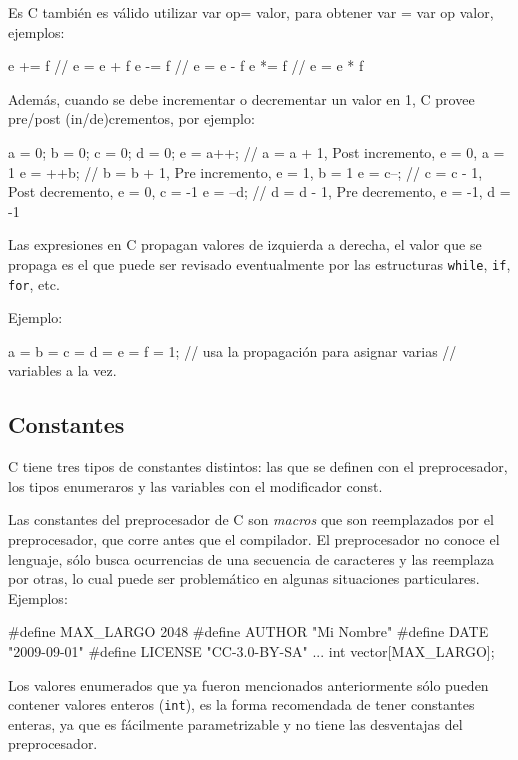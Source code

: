 Es C también es válido utilizar var op= valor, para obtener var = var op
valor, ejemplos:

\begin{codigo-c-plano}
e += f // e = e + f
e -= f // e = e - f
e *= f // e = e * f
\end{codigo-c-plano}

Además, cuando se debe incrementar o decrementar un valor en 1, C provee
pre/post (in/de)crementos, por ejemplo:

\begin{codigo-c-plano}
a = 0; b = 0; c = 0; d = 0;
e = a++; // a = a + 1, Post incremento, e = 0, a = 1
e = ++b; // b = b + 1, Pre incremento, e = 1, b = 1
e = c--; // c = c - 1, Post decremento, e = 0, c = -1
e = --d; // d = d - 1, Pre  decremento, e = -1, d = -1
\end{codigo-c-plano}

Las expresiones en C propagan valores de izquierda a derecha, el valor que se
propaga es el que puede ser revisado eventualmente por las estructuras
\lstinline!while!, \lstinline!if!, \lstinline!for!, etc.

Ejemplo:

\begin{codigo-c-plano}
a = b = c = d = e = f = 1; // usa la propagación para asignar varias
                           // variables a la vez.
\end{codigo-c-plano}

\subsection{Constantes}

C tiene tres tipos de constantes distintos: las que se definen con el
preprocesador, los tipos enumeraros y las variables con el modificador const.

Las constantes del preprocesador de C son \textit{macros} que son reemplazados
por el preprocesador, que corre antes que el compilador. El preprocesador no
conoce el lenguaje, sólo busca ocurrencias de una secuencia de caracteres y
las reemplaza por otras, lo cual puede ser problemático en algunas situaciones
particulares.  Ejemplos:

\begin{codigo-c-plano}
#define MAX_LARGO 2048
#define AUTHOR "Mi Nombre"
#define DATE "2009-09-01"
#define LICENSE "CC-3.0-BY-SA"
...
    int vector[MAX_LARGO];
\end{codigo-c-plano}

Los valores enumerados que ya fueron mencionados anteriormente sólo pueden
contener valores enteros (\lstinline!int!), es la forma recomendada de tener
constantes enteras, ya que es fácilmente parametrizable y no tiene las
desventajas del preprocesador.

